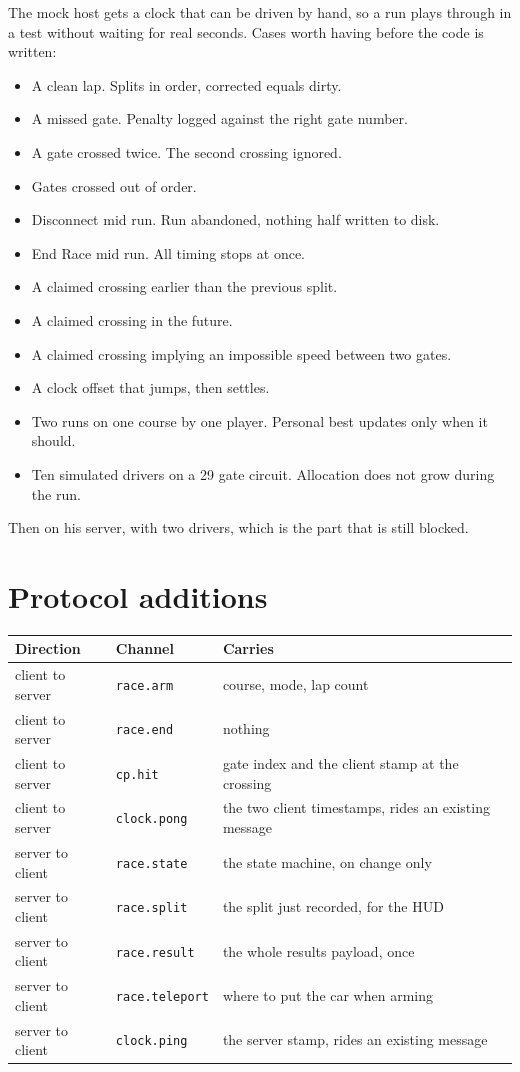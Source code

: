\documentclass[11pt,a4paper]{article}
\newcommand{\code}[1]{\texttt{\small #1}}
\begin{document}
The mock host gets a clock that can be driven by hand, so a run plays through
in a test without waiting for real seconds. Cases worth having before the code
is written:

\begin{itemize}
  \item A clean lap. Splits in order, corrected equals dirty.
  \item A missed gate. Penalty logged against the right gate number.
  \item A gate crossed twice. The second crossing ignored.
  \item Gates crossed out of order.
  \item Disconnect mid run. Run abandoned, nothing half written to disk.
  \item End Race mid run. All timing stops at once.
  \item A claimed crossing earlier than the previous split.
  \item A claimed crossing in the future.
  \item A claimed crossing implying an impossible speed between two gates.
  \item A clock offset that jumps, then settles.
  \item Two runs on one course by one player. Personal best updates only when
        it should.
  \item Ten simulated drivers on a 29 gate circuit. Allocation does not grow
        during the run.
\end{itemize}

Then on his server, with two drivers, which is the part that is still blocked.

\section{Protocol additions}

\begin{longtable}{@{}lll@{}}
\toprule
\textbf{Direction} & \textbf{Channel} & \textbf{Carries} \\
\midrule
\endhead
client to server & \code{race.arm}      & course, mode, lap count \\
client to server & \code{race.end}      & nothing \\
client to server & \code{cp.hit}        & gate index and the client stamp at the crossing \\
client to server & \code{clock.pong}    & the two client timestamps, rides an existing message \\
server to client & \code{race.state}    & the state machine, on change only \\
server to client & \code{race.split}    & the split just recorded, for the HUD \\
server to client & \code{race.result}   & the whole results payload, once \\
server to client & \code{race.teleport} & where to put the car when arming \\
server to client & \code{clock.ping}    & the server stamp, rides an existing message \\
\bottomrule
\end{longtable}
\end{document}
